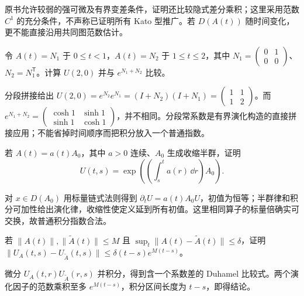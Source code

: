 原书允许较弱的强可微及有界变差条件，证明还比较隐式差分乘积；这里采用范数 $C^1$ 的充分条件，不声称已证明所有 Kato 型推广。若 $D(A(t))$ 随时间变化，更不能直接沿用共同图范数估计。

\begin{exercise}[非交换的时间顺序]\label{ex:y14-time-order}
令 $A(t)=N_1$ 于 $0\le t<1$，$A(t)=N_2$ 于 $1\le t\le2$，其中 $N_1=\left(\begin{smallmatrix}0&1\\0&0\end{smallmatrix}\right)$、$N_2=N_1^{\mathsf T}$。计算 $U(2,0)$ 并与 $e^{N_1+N_2}$ 比较。
\end{exercise}
\begin{solution}
分段拼接给出 $U(2,0)=e^{N_2}e^{N_1}=(I+N_2)(I+N_1)=\left(\begin{smallmatrix}1&1\\1&2\end{smallmatrix}\right)$。而 $e^{N_1+N_2}=\left(\begin{smallmatrix}\cosh1&\sinh1\\\sinh1&\cosh1\end{smallmatrix}\right)$，并不相同。分段常系数是有界演化构造的直接拼接应用；不能省掉时间顺序而把积分放入一个普通指数。
\end{solution}

\begin{exercise}[可交换的时间变换]\label{ex:y14-time-change}
若 $A(t)=a(t)A_0$，其中 $a>0$ 连续、$A_0$ 生成收缩半群，证明
\[
 U(t,s)=\exp\left(\left(\int_s^ta(r)\,\dd r\right)A_0\right).
\]
\end{exercise}
\begin{solution}
对 $x\in D(A_0)$ 用标量链式法则得到 $\partial_tU=a(t)A_0U$，初值为恒等；半群律和积分可加性给出演化律，收缩性使定义延到所有初值。这里相同算子的标量倍确实可交换，故普通积分指数合法。
\end{solution}

\begin{exercise}[有界系数的扰动误差]\label{ex:y14-evolution-error}
若 $\|A(t)\|,\|\widetilde A(t)\|\le M$ 且 $\sup_t\|A(t)-\widetilde A(t)\|\le\delta$，证明 $\|U_A(t,s)-U_{\widetilde A}(t,s)\|\le\delta(t-s)e^{M(t-s)}$。
\end{exercise}
\begin{solution}
微分 $U_A(t,r)U_{\widetilde A}(r,s)$ 并积分，得到含一个系数差的 Duhamel 比较式。两个演化因子的范数乘积至多 $e^{M(t-s)}$，积分区间长度为 $t-s$，即得结论。
\end{solution}
